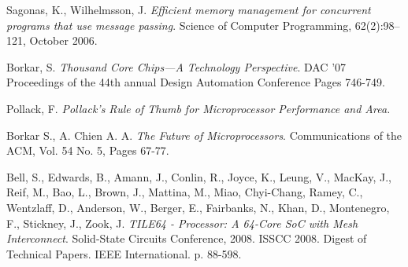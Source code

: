 \documentclass[english,11pt]{article}
\begin{document}
\clearpage
\begin{thebibliography}{9}

     Sagonas, K., Wilhelmsson, J. \emph{Efficient memory
        management for concurrent programs that use message passing}. Science of
        Computer Programming, 62(2):98--121, October 2006.

     Borkar, S. \emph{Thousand Core Chips—A Technology
        Perspective}. DAC '07 Proceedings of the 44th annual Design Automation
        Conference Pages 746-749.

     Pollack, F. \emph{Pollack's Rule of Thumb for Microprocessor
        Performance and Area.}

     Borkar S., A. Chien A. A. \emph{The Future
        of Microprocessors}. Communications of the ACM, Vol. 54 No. 5, Pages
        67-77.

     Bell, S., Edwards, B., Amann, J., Conlin, R.,
        Joyce, K., Leung, V., MacKay, J., Reif, M., Bao, L., Brown, J.,
        Mattina, M., Miao, Chyi-Chang, Ramey, C., Wentzlaff, D.,
        Anderson, W., Berger, E., Fairbanks, N., Khan, D., Montenegro, F.,
        Stickney, J., Zook, J. \emph{TILE64 - Processor: A 64-Core SoC with
        Mesh Interconnect}. Solid-State Circuits Conference, 2008. ISSCC 2008.
        Digest of Technical Papers. IEEE International. p. 88-598.

\end{thebibliography}
\end{document}
